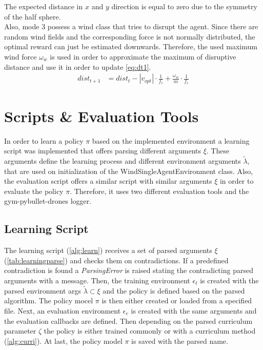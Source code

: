 The expected distance in $x$ and $y$ direction is equal to zero due to the symmetry of the half sphere.\\
Also, mode 3 possess a wind class that tries to disrupt the agent. Since there are random wind fields and the corresponding 
force is not normally distributed, the optimal reward can just be estimated downwards. 
Therefore, the used maximum wind force $\omega_w$ is used in order to approximate the maximum of disruptive distance and use it in order to update \cref{eq:dt1}.
\begin{align}
	dist_{t+1} &= dist_t - | v_{opt} | \cdot \frac{1}{f_c} + \frac{\omega_w}{m} \cdot \frac{1}{f_c}
\end{align}
\newpage



\newpage

\section{Scripts \& Evaluation Tools} \label{sec:scripts}
In order to learn a policy $\pi$ based on the implemented environment a learning script was implemented that offers parsing different arguments $\xi$. 
These arguments define the learning process and different environment arguments $\tilde{\lambda}$, that are used on initialization of the WindSingleAgentEnvironment class.
Also, the evaluation script offers a similar script with similar arguments $\xi$ in order to evaluate the policy $\pi$.
Therefore, it uses two different evaluation tools and the gym-pybullet-drones logger. 


\subsection{Learning Script}
The learning script (\cref{alg:learn}) receives a set of parsed arguments $\xi$ (\cref{tab:learningparse}) and checks them on contradictions. 
If a predefined contradiction is found a \emph{ParsingError} is raised stating the contradicting parsed arguments with a message.
Then, the training environment $\epsilon_t$ is created with the parsed environment args $\tilde{\lambda} \subset \xi$ and the policy 
is defined based on the parsed algorithm. The policy mocel $\pi$ is then either created or loaded from a specified file. 
Next, an evaluation environment $\epsilon_e$ is created with the same arguments and the evaluation callbacks are defined. 
Then depending on the parsed curriculum parameter $\zeta$ the policy is either trained commonly or with a curriculum method (\cref{alg:curri}).
At last, the policy model $\pi$ is saved with the parsed name.

